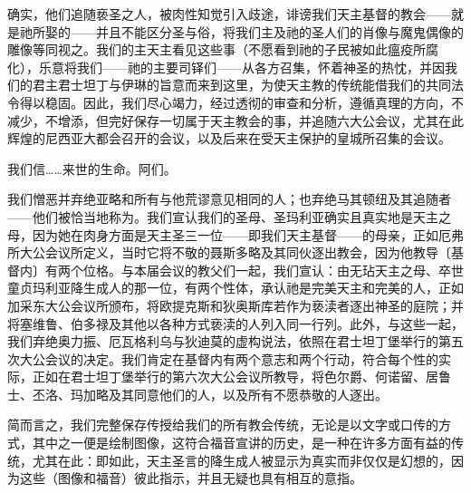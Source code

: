 确实，他们追随亵圣之人，被肉性知觉引入歧途，诽谤我们天主基督的教会——就是祂所娶的——并且不能区分圣与俗，将我们主及祂的圣人们的肖像与魔鬼偶像的雕像等同视之。我们的主天主看见这些事（不愿看到祂的子民被如此瘟疫所腐化），乐意将我们——祂的主要司铎们——从各方召集，怀着神圣的热忱，并因我们的君主君士坦丁与伊琳的旨意而来到这里，为使天主教的传统能借我们的共同法令得以稳固。因此，我们尽心竭力，经过透彻的审查和分析，遵循真理的方向，不减少，不增添，但完好保存一切属于天主教会的事，并追随六大公会议，尤其在此辉煌的尼西亚大都会召开的会议，以及后来在受天主保护的皇城所召集的会议。\par

我们信……来世的生命。阿们。\par

我们憎恶并弃绝亚略和所有与他荒谬意见相同的人；也弃绝马其顿纽及其追随者——他们被恰当地称为。我们宣认我们的圣母、圣玛利亚确实且真实地是天主之母，因为她在肉身方面是天主圣三一位——即我们天主基督——的母亲，正如厄弗所大公会议所定义，当时它将不敬的聂斯多略及其同伙逐出教会，因为他教导〔基督内〕有两个位格。与本届会议的教父们一起，我们宣认：由无玷天主之母、卒世童贞玛利亚降生成人的那一位，有两个性体，承认祂是完美天主和完美的人，正如加采东大公会议所颁布，将欧提克斯和狄奥斯库若作为亵渎者逐出神圣的庭院；并将塞维鲁、伯多禄及其他以各种方式亵渎的人列入同一行列。此外，与这些一起，我们弃绝奥力振、厄瓦格利乌与狄迪莫的虚构说法，依照在君士坦丁堡举行的第五次大公会议的决定。我们肯定在基督内有两个意志和两个行动，符合每个性的实际，正如在君士坦丁堡举行的第六次大公会议所教导，将色尔爵、何诺留、居鲁士、丕洛、玛加略及其同意他们的人，以及所有不愿恭敬的人逐出。\par

简而言之，我们完整保存传授给我们的所有教会传统，无论是以文字或口传的方式，其中之一便是绘制图像，这符合福音宣讲的历史，是一种在许多方面有益的传统，尤其在此：即如此，天主圣言的降生成人被显示为真实而非仅仅是幻想的，因为这些（图像和福音）彼此指示，并且无疑也具有相互的意指。\par

